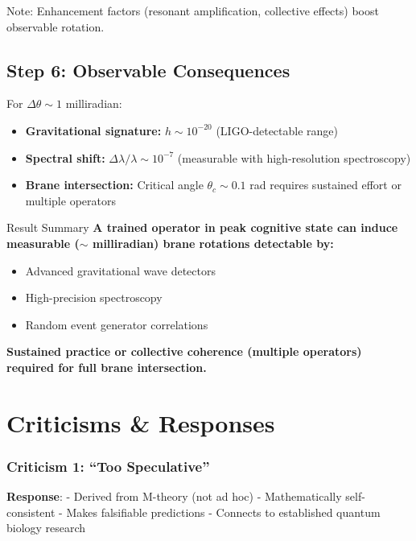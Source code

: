 Note: Enhancement factors (resonant amplification, collective effects) boost observable rotation.

\subsection*{Step 6: Observable Consequences}

For $\Delta\theta \sim 1$ milliradian:

\begin{itemize}
\item \textbf{Gravitational signature:} $h \sim 10^{-20}$ (LIGO-detectable range)
\item \textbf{Spectral shift:} $\Delta\lambda/\lambda \sim 10^{-7}$ (measurable with high-resolution spectroscopy)
\item \textbf{Brane intersection:} Critical angle $\theta_c \sim 0.1$ rad requires sustained effort or multiple operators
\end{itemize}

\begin{calloutbox}[colback=black!5!white,colframe=black]{Result Summary}
\textbf{A trained operator in peak cognitive state can induce measurable ($\sim$ milliradian) brane rotations detectable by:}
\begin{itemize}
\item Advanced gravitational wave detectors
\item High-precision spectroscopy
\item Random event generator correlations
\end{itemize}

\textbf{Sustained practice or collective coherence (multiple operators) required for full brane intersection.}
\end{calloutbox}

\section{Criticisms \& Responses}
\label{sec:criticisms}

\subsubsection{Criticism 1: ``Too
Speculative''}\label{criticism-1-too-speculative}

\textbf{Response}: - Derived from M-theory (not ad hoc) - Mathematically
self-consistent - Makes falsifiable predictions - Connects to
established quantum biology research

